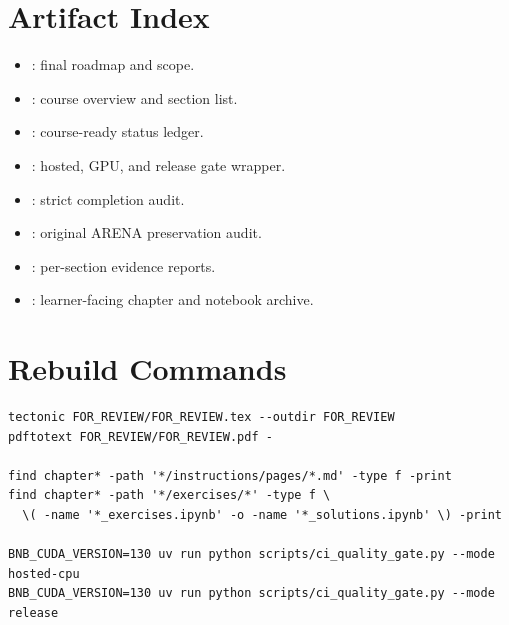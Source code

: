\documentclass[11pt]{article}
\begin{document}
\section{Artifact Index}
\begin{itemize}
  \item {}: final roadmap and scope.
  \item {}: course overview and section list.
  \item {}: course-ready status ledger.
  \item {}: hosted, GPU, and release gate wrapper.
  \item {}: strict completion
  audit.
  \item {}: original ARENA
  preservation audit.
  \item {}: per-section
  evidence reports.
  \item {}:
  learner-facing chapter and notebook archive.
\end{itemize}

\section{Rebuild Commands}
\begin{verbatim}
tectonic FOR_REVIEW/FOR_REVIEW.tex --outdir FOR_REVIEW
pdftotext FOR_REVIEW/FOR_REVIEW.pdf -

find chapter* -path '*/instructions/pages/*.md' -type f -print
find chapter* -path '*/exercises/*' -type f \
  \( -name '*_exercises.ipynb' -o -name '*_solutions.ipynb' \) -print

BNB_CUDA_VERSION=130 uv run python scripts/ci_quality_gate.py --mode hosted-cpu
BNB_CUDA_VERSION=130 uv run python scripts/ci_quality_gate.py --mode release
\end{verbatim}
\end{document}

